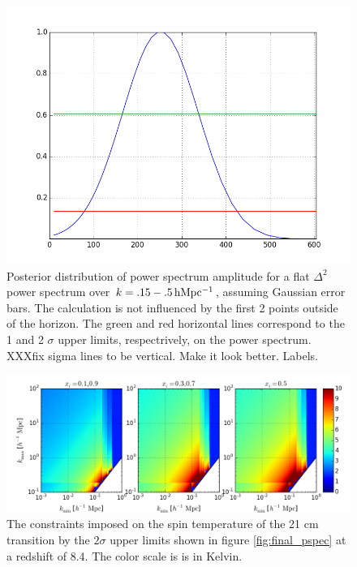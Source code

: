 \documentclass[twocolumn,numberedappendix]{emulateapj} \shorttitle{PSA64}
\begin{document}
\begin{figure}[t!]\centering
\includegraphics[width=\columnwidth]{plots/flat_k3pk_posterior.png}
\caption{Posterior distribution of power spectrum amplitude for a flat $\Delta^{2}$
power spectrum over $k=.15 - .5 \rm \,hMpc^{-1}$,
assuming Gaussian error bars. The calculation is not influenced by the first 2 points outside of the horizon. The green and red
horizontal lines correspond to the 1 and 2 $\sigma$ upper limits, respectrively,
on the power spectrum. XXXfix sigma lines to be vertical. Make it look better.
Labels.
}
\label{fig:final_posterior}
\end{figure}

\begin{figure}[b!]\centering
\includegraphics[width=2\columnwidth]{plots/ts_patchy_bound.png}
\caption{The constraints imposed on the spin temperature of the 21 cm
transition by the $2\sigma$ upper limits shown in figure \ref{fig:final_pspec} at a redshift of 8.4. The color scale is is in Kelvin.}
\label{fig:patchy_bound}
\end{figure}
\end{document}
